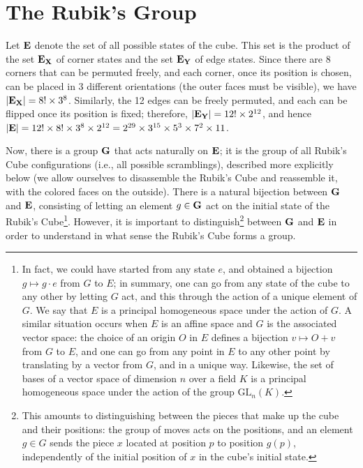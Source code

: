 \section{The Rubik's Group}

Let $\mathbf{E}$ denote the set of all possible states of the cube. This set is the product of the set $\mathbf{E}_{\mathbf{X}}$ of corner states and the set $\mathbf{E}_{\mathbf{Y}}$ of edge states. Since there are 8 corners that can be permuted freely, and each corner, once its position is chosen, can be placed in 3 different orientations (the outer faces must be visible), we have $|\mathbf{E}_{\mathbf{X}}| = 8! \times 3^8$.
Similarly, the 12 edges can be freely permuted, and each can be flipped once its position is fixed; therefore, $|\mathbf{E}_{\mathbf{Y}}| = 12! \times 2^{12}$, and hence $|\mathbf{E}| = 12! \times 8! \times 3^8 \times 2^{12} = 2^{29} \times 3^{15} \times 5^{3} \times 7^{2} \times 11$.

Now, there is a group $\mathbf{G}$ that acts naturally on $\mathbf{E}$; it is the group of all Rubik's Cube configurations (i.e., all possible scramblings), described more explicitly below (we allow ourselves to disassemble the Rubik's Cube and reassemble it, with the colored faces on the outside). There is a natural bijection between $\mathbf{G}$ and $\mathbf{E}$, consisting of letting an element $g \in \mathbf{G}$ act on the initial state of the Rubik's Cube\footnote{In fact, we could have started from any state $e$, and obtained a bijection $g \mapsto g \cdot e$ from $G$ to $E$; in summary, one can go from any state of the cube to any other by letting $G$ act, and this through the action of a unique element of $G$. We say that $E$ is a principal homogeneous space under the action of $G$.
A similar situation occurs when $E$ is an affine space and $G$ is the associated vector space: the choice of an origin $O$ in $E$ defines a bijection $v \mapsto O + v$ from $G$ to $E$, and one can go from any point in $E$ to any other point by translating by a vector from $G$, and in a unique way.
Likewise, the set of bases of a vector space of dimension $n$ over a field $K$ is a principal homogeneous space under the action of the group $\mathrm{GL}_n(K)$.}. However, it is important to distinguish\footnote{This amounts to distinguishing between the pieces that make up the cube and their positions: the group of moves acts on the positions, and an element $g \in G$ sends the piece $x$ located at position $p$ to position $g(p)$, independently of the initial position of $x$ in the cube's initial state.} between $\mathbf{G}$ and $\mathbf{E}$ in order to understand in what sense the Rubik's Cube forms a group.

